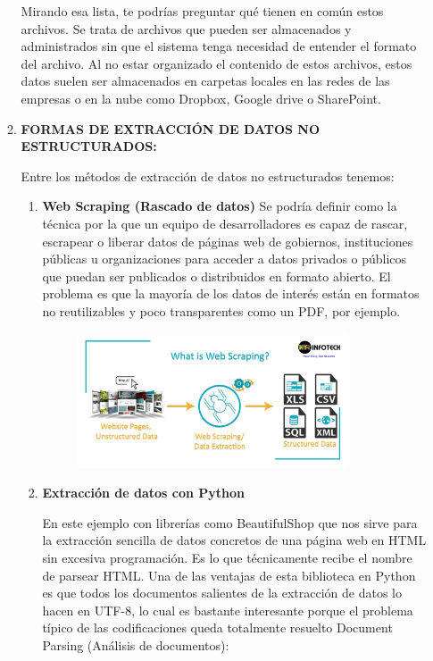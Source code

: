 \documentclass[12pt,a4paper,oneside]{book}
\begin{document}
\begin{enumerate}
\begin{enumerate}
					Mirando esa lista, te podrías preguntar qué tienen en común estos archivos. Se trata de archivos que pueden ser almacenados y administrados sin que el sistema tenga necesidad de entender el formato del archivo. Al no estar organizado el contenido de estos archivos, estos datos suelen ser almacenados en carpetas locales en las redes de las empresas o en la nube como Dropbox, Google drive o SharePoint.\\
					
					\item \textbf{FORMAS DE EXTRACCIÓN DE DATOS NO ESTRUCTURADOS:}
					
					Entre los métodos de extracción de datos no estructurados tenemos:\\
					
					\begin{enumerate}
						
						\item \textbf{ Web Scraping (Rascado de datos)}
							Se podría definir como la técnica por la que un equipo de desarrolladores es capaz de rascar, escrapear o liberar datos de páginas web de gobiernos, instituciones públicas u organizaciones para acceder a datos privados o públicos que puedan ser publicados o distribuidos en formato abierto. El problema es que la mayoría de los datos de interés están en formatos no reutilizables y poco transparentes como un PDF, por ejemplo.
							
							\begin{figure}[htb]
								\centering \includegraphics[width=8cm, height=4cm]{img/scraping.png}
							\end{figure}
						
						\item \textbf{ Extracción de datos con Python}
						
							En este ejemplo con librerías como BeautifulShop que nos sirve para la extracción sencilla de datos concretos de una página web en HTML sin excesiva programación. Es lo que técnicamente recibe el nombre de parsear HTML. Una de las ventajas de esta biblioteca en Python es que todos los documentos salientes de la extracción de datos lo hacen en UTF-8, lo cual es bastante interesante porque el problema típico de las codificaciones queda totalmente resuelto
							Document Parsing (Análisis de documentos):\\


\end{enumerate}
\end{enumerate}
\end{enumerate}
\end{document}
